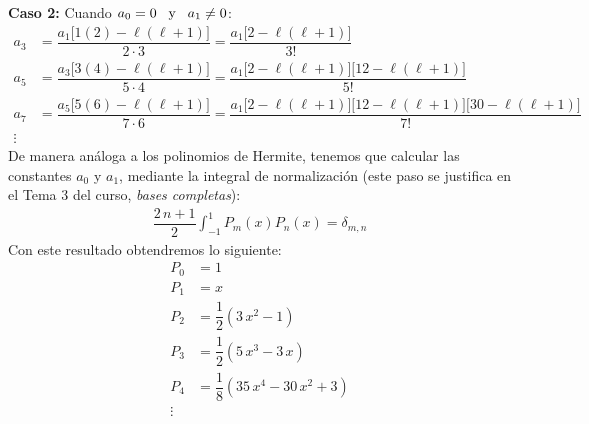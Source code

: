 \textbf{Caso 2:} Cuando $a_{0} = 0 \hspace{0.3cm} \mbox{y} \hspace{0.3cm} a_{1} \neq 0$:
\begin{align*}
a_{3} &= \dfrac{a_{1} \big[ 1 (2) - \ell (\ell + 1) \big]}{2 \cdot 3} = \dfrac{a_{1} \big[ 2 - \ell (\ell + 1 ) \big]}{3!} \\[0.5em]
a_{5} &= \dfrac{a_{3} \big[ 3 (4) - \ell (\ell + 1) \big]}{5 \cdot 4} = \dfrac{a_{1} \big[ 2 - \ell (\ell + 1 ) \big] \big[ 12 - \ell (\ell + 1) \big]}{5!} \\[0.5em]
a_{7} &= \dfrac{a_{5} \big[ 5 (6) - \ell (\ell + 1) \big]}{7 \cdot 6} = \dfrac{a_{1} \big[ 2 - \ell (\ell + 1 ) \big] \big[ 12 - \ell (\ell + 1) \big] \big[ 30 - \ell (\ell + 1) \big]}{7!} \\[0.5em]
\vdots
\end{align*}
De manera análoga a los polinomios de Hermite, tenemos que calcular las constantes $a_{0}$ y $a_{1}$, mediante la integral de normalización (este paso se justifica en el Tema 3 del curso, \emph{bases completas}):
\begin{align*}
\dfrac{2 \, n + 1}{2} \int_{-1}^{1} P_{m} (x) P_{n} (x) = \delta_{m, n}
\end{align*}
Con este resultado obtendremos lo siguiente:
\begin{align*}
P_{0} &= 1 \\[0.5em]
P_{1} &= x \\[0.5em]
P_{2} &= \dfrac{1}{2} \left( 3 \, x^{2} - 1 \right) \\[0.5em]
P_{3} &= \dfrac{1}{2} \left( 5 \, x^{3} - 3 \, x \right) \\[0.5em]
P_{4} &= \dfrac{1}{8} \left( 35 \, x^{4} - 30 \, x^{2} + 3 \right) \\[0.5em]
\vdots
\end{align*}
